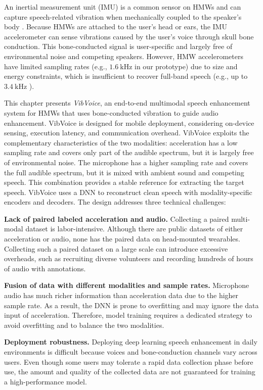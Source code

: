 An inertial measurement unit (IMU) is a common sensor on HMWs and can capture speech-related vibration when mechanically coupled to the speaker's body \citep{ba2020learning, wang2021audio}. Because HMWs are attached to the user's head or ears, the IMU accelerometer can sense vibrations caused by the user's voice through skull bone conduction. This bone-conducted signal is user-specific and largely free of environmental noise and competing speakers. However, HMW accelerometers have limited sampling rates (e.g., $1.6~\text{kHz}$ in our prototype) due to size and energy constraints, which is insufficient to recover full-band speech (e.g., up to $3.4~\text{kHz}$ \citep{Voicefre75:online}).

This chapter presents \textit{VibVoice}, an end-to-end multimodal speech enhancement system for HMWs that uses bone-conducted vibration to guide audio enhancement. VibVoice is designed for mobile deployment, considering on-device sensing, execution latency, and communication overhead.
VibVoice exploits the complementary characteristics of the two modalities: acceleration has a low sampling rate and covers only part of the audible spectrum, but it is largely free of environmental noise. The microphone has a higher sampling rate and covers the full audible spectrum, but it is mixed with ambient sound and competing speech. This combination provides a stable reference for extracting the target speech.
VibVoice uses a DNN to reconstruct clean speech with modality-specific encoders and decoders. The design addresses three technical challenges:

\noindent\textbf{Lack of paired labeled acceleration and audio.}
Collecting a paired multi-modal dataset is labor-intensive. Although there are public datasets of either acceleration or audio, none has the paired data on head-mounted wearables.
Collecting such a paired dataset on a large scale can introduce excessive overheads, such as recruiting diverse volunteers and recording hundreds of hours of audio with annotations.

\noindent\textbf{Fusion of data with different modalities and sample rates.}
Microphone audio has much richer information than acceleration data due to the higher sample rate. As a result, the DNN is prone to overfitting and may ignore the data input of acceleration.
Therefore, model training requires a dedicated strategy to avoid overfitting and to balance the two modalities.

\noindent\textbf{Deployment robustness.}
Deploying deep learning speech enhancement in daily environments is difficult because voices and bone-conduction channels vary across users.
Even though some users may tolerate a rapid data collection phase before use, the amount and quality of the collected data are not guaranteed for training a high-performance model.

